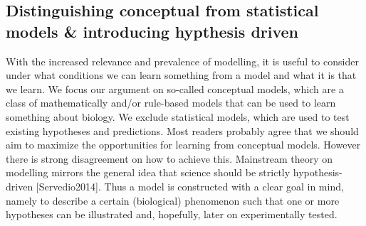 \subsection{Distinguishing conceptual from statistical models & introducing hypthesis driven}

With the increased relevance and prevalence of modelling, it is useful to consider under what conditions we can learn something from a model and what it is that we learn. We focus our argument on so-called  conceptual models, which are a class of mathematically and/or rule-based models that can be used to learn something about biology. We exclude statistical models, which are used to test existing hypotheses and predictions. Most readers probably agree that we should aim to maximize the opportunities for learning from conceptual models. However there is strong disagreement on how to achieve this. Mainstream theory on modelling mirrors the general idea that science should be strictly hypothesis-driven [Servedio2014]. Thus a model is constructed with a clear goal in mind, namely to describe a certain (biological) phenomenon such that one or more hypotheses can be illustrated and, hopefully, later on experimentally tested.
